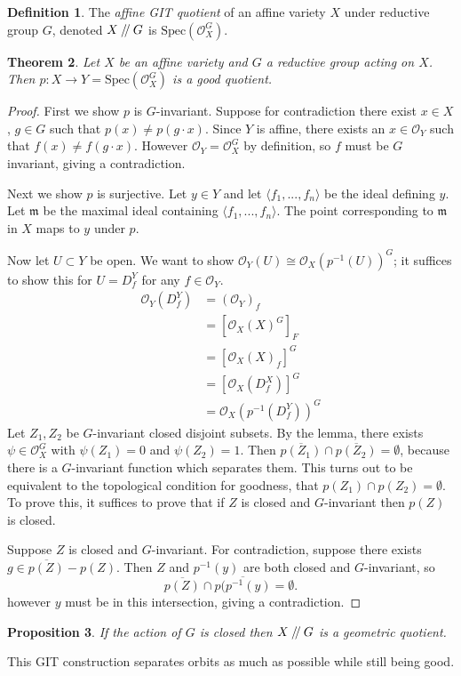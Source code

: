 \documentclass{article}
\newtheorem{theorem}{Theorem}
\newtheorem{prop}[theorem]{Proposition}
\theoremstyle{definition}
\newtheorem{definition}[theorem]{Definition}
\theoremstyle{remark}
\numberwithin{theorem}{section}
\newcommand{\OO}{\mathcal{O}}
\newcommand{\sslash}{\mathbin{/\mkern-4mu/}}
\newcommand{\Spec}{\text{Spec}}
\newcommand{\m}{\mathfrak{m}}
\newenvironment{thm}{
\begin{mdframed}
	\vspace{-0.5em}
	\begin{theorem}
}{
	\end{theorem}
\end{mdframed}
}
\newenvironment{defn}{
	\begin{mdframed}
		\vspace{-0.5em}
		\begin{definition}
		}{
		\end{definition}
	\end{mdframed}
}
\begin{document}
\begin{defn}
	The \emph{affine GIT quotient} of an affine variety $X$ under reductive group $G$, denoted $X\sslash G$ is $\Spec(\OO_X^G)$.
\end{defn}
\begin{thm}
	Let $X$ be an affine variety and $G$ a reductive group acting on $X$. Then $p:X\to Y=\Spec(\OO_X^G)$ is a good quotient.
\end{thm}
\begin{proof}
	First we show $p$ is $G$-invariant. Suppose for contradiction there exist $x\in X$, $g\in G$ such that $p(x) \neq p(g\cdot x)$. Since $Y$ is affine, there exists an $x\in \OO_Y$ such that $f(x)\neq f(g\cdot x)$. However $\OO_Y = \OO_X^G$ by definition, so $f$ must be $G$ invariant, giving a contradiction. \vspace{1em}
	
	Next we show $p$ is surjective. Let $y\in Y$ and let $\langle f_1,...,f_n\rangle$ be the ideal defining $y$. Let $\m$ be the maximal ideal containing $\langle f_1,...,f_n\rangle$. The point corresponding to $\m$ in $X$ maps to $y$ under $p$. \vspace{1em}
	
	Now let $U\subset Y$ be open. We want to show $\OO_Y(U)\cong \OO_X(p^{-1}(U))^G$; it suffices to show this for $U=D_f^Y$ for any $f\in \OO_Y$.
	\begin{align*}
		\OO_Y(D_f^Y) &= (\OO_Y)_f\\
		&= [\OO_X(X)^G]_F\\
		& =[\OO_X(X)_f]^G\\
		&=[\OO_X(D_f^X)]^G\\
		&=\OO_X(p^{-1}(D_f^Y))^G
	\end{align*} 
	Let $Z_1,Z_2$ be $G$-invariant closed disjoint subsets. By the lemma, there exists $\psi \in \OO_X^G$ with $\psi(Z_1)=0$ and $\psi(Z_2)=1$. Then $\overline{p(Z_1)}\cap\overline{p(Z_2)}=\emptyset$, because there is a $G$-invariant function which separates them. This turns out to be equivalent to the topological condition for goodness, that $p(Z_1)\cap p(Z_2)=\emptyset$. To prove this, it suffices to prove that if $Z$ is closed and $G$-invariant then $p(Z)$ is closed. \vspace{1em}
	
	Suppose $Z$ is closed and $G$-invariant. For contradiction, suppose there exists $g\in \overline{p(Z)}-p(Z)$. Then $Z$ and $p^{-1}(y)$ are both closed and $G$-invariant, so 
	\begin{equation}
		\overline{p(Z)}\cap\overline{p(p^{-1}(y)} = \emptyset.
	\end{equation}
however $y$ must be in this intersection, giving a contradiction.
\end{proof}
\begin{prop}
	If the action of $G$ is closed then $X\sslash G$ is a geometric quotient.
\end{prop}
This GIT construction separates orbits as much as possible while still being good.
\end{document}
